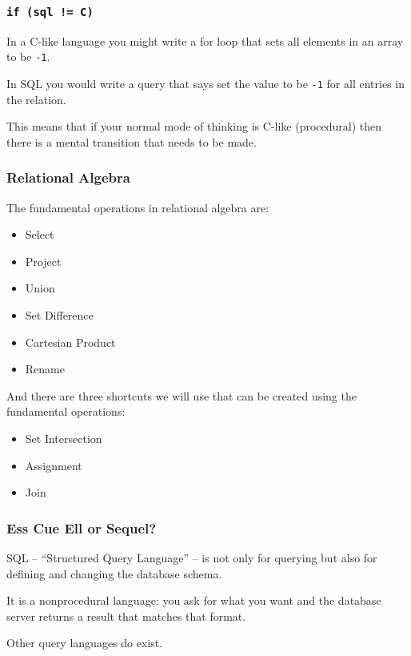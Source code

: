 \begin{frame}
\frametitle{\texttt{if (sql != C)} }

In a C-like language you might write a for loop that sets all elements in an array to be \texttt{-1}. 

In SQL you would write a query that says set the value to be \texttt{-1} for all entries in the relation. 

This means that if your normal mode of thinking is C-like (procedural) then there is a mental transition that needs to be made. 

\end{frame}



\begin{frame}
\frametitle{Relational Algebra}


The fundamental operations in relational algebra are:
\begin{itemize}
	\item Select
	\item Project
	\item Union
	\item Set Difference
	\item Cartesian Product
	\item Rename
\end{itemize}

And there are three shortcuts we will use that can be created using the fundamental operations: 

\begin{itemize}
	\item Set Intersection
	\item Assignment
	\item Join
\end{itemize}


\end{frame}



\begin{frame}
\frametitle{Ess Cue Ell or Sequel?}

SQL -- ``Structured Query Language'' -- is not only for querying but also for defining and changing the database schema. 

It is a nonprocedural language: you ask for what you want and the database server returns a result that matches that format.

Other query languages do exist.

\end{frame}



